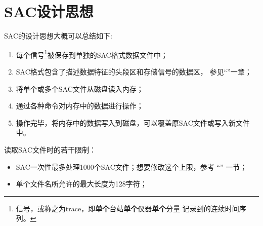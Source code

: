\section{SAC设计思想}
SAC的设计思想大概可以总结如下:
\begin{enumerate}
\item 每个信号\footnote{信号，或称之为trace，即\textbf{单个}台站\textbf{单个}仪器\textbf{单个}分量
    记录到的连续时间序列。}被保存到单独的SAC格式数据文件中；
\item SAC格式包含了描述数据特征的头段区和存储信号的数据区，
    参见``''一章；
\item 将单个或多个SAC文件从磁盘读入内存；
\item 通过各种命令对内存中的数据进行操作；
\item 操作完毕，将内存中的数据写入到磁盘，可以覆盖原SAC文件或写入新文件中。
\end{enumerate}

读取SAC文件时的若干限制：
\begin{itemize}
\item SAC一次性最多处理1000个SAC文件；想要修改这个上限，参考
    ``'' 一节；
\item 单个文件名所允许的最大长度为128字符；
\end{itemize}

